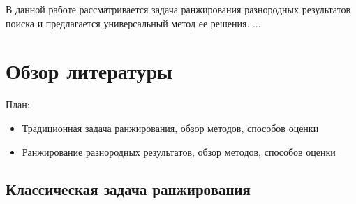 \documentclass[12pt,a4paper]{report}
\begin{document}








В данной работе рассматривается задача ранжирования разнородных результатов поиска и предлагается универсальный метод ее решения. ...

\chapter{Обзор литературы}

План:

\begin{itemize}
  \item Традиционная задача ранжирования, обзор методов, способов оценки
  \item Ранжирование разнородных результатов, обзор методов, способов оценки
\end{itemize}

\section{Классическая задача ранжирования}
\end{document}
